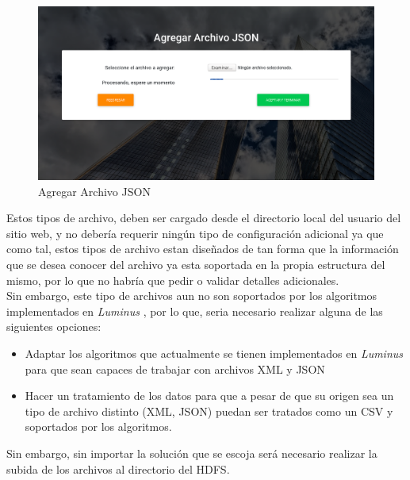 \begin{figure}[H]
	\hypertarget{fig:red}{\hspace{1pt}}
	\begin{center}
		\includegraphics[width=1\textwidth]{capitulo7/images/agregarJSON.png}
		\caption{Agregar Archivo JSON}
		\label{fig:XML}
	\end{center}
\end{figure}
Estos tipos de archivo, deben ser cargado desde el directorio local del usuario del sitio web, y no debería requerir ningún tipo de configuración adicional ya que como tal, estos tipos de archivo estan diseñados de tan forma que la información que se desea conocer del archivo ya esta soportada en la propia estructura del mismo, por lo que no habría que pedir o validar detalles adicionales.\\
Sin embargo, este tipo de archivos aun no son soportados por los algoritmos implementados en \emph{Luminus} , por lo que, seria necesario realizar alguna de las siguientes opciones:
\begin{itemize}
	\item Adaptar los algoritmos que actualmente se tienen implementados en \emph{Luminus} para que sean capaces de trabajar con archivos XML y JSON
	\item Hacer un tratamiento de los datos para que a pesar de que su origen sea un tipo de archivo distinto (XML, JSON) puedan ser tratados como un CSV y soportados por los algoritmos. 
\end{itemize} 
Sin embargo, sin importar la solución que se escoja será necesario realizar la subida de los archivos al directorio del HDFS.\\

